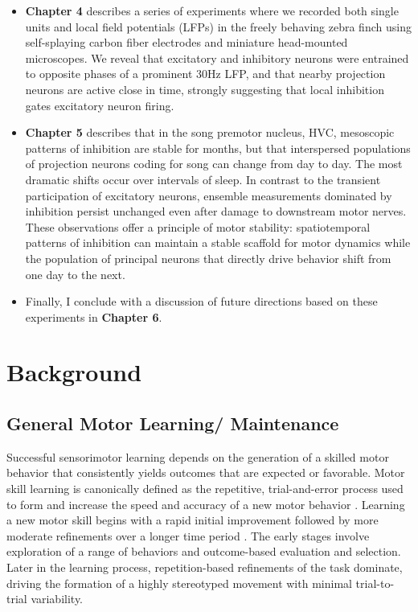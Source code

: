 \begin{itemize}
	\item \textbf{Chapter 4}  describes a series of experiments where we recorded both single units and local field potentials (LFPs) in the freely behaving zebra finch using self-splaying carbon fiber electrodes and miniature head-mounted microscopes. We reveal that excitatory and inhibitory neurons were entrained to opposite phases of a prominent 30Hz LFP, and that nearby projection neurons are active close in time,  strongly suggesting that local inhibition gates excitatory neuron firing.

	\item  \textbf{Chapter 5} describes that in the song  premotor nucleus, HVC, mesoscopic patterns of inhibition are stable for months, but that interspersed populations of projection neurons coding for song can change from day to day. The most dramatic shifts occur over intervals of sleep. In contrast to the transient participation of excitatory neurons, ensemble measurements dominated by inhibition persist unchanged even after damage to downstream motor nerves. These observations offer a principle of motor stability: spatiotemporal patterns of inhibition can maintain a stable scaffold for motor dynamics while the population of principal neurons that directly drive behavior shift from one day to the next.

	\item Finally, I conclude with a discussion of future directions based on these experiments in \textbf{Chapter 6}.
		
	\end{itemize}


\section{Background}


\subsection{ General Motor Learning/ Maintenance}

Successful sensorimotor learning depends on the generation of a skilled motor behavior that consistently yields outcomes that are expected or favorable. Motor skill learning is canonically defined as the repetitive, trial-and-error process used to form and increase the speed and accuracy of a new motor behavior \cite{Diedrichsen2015-zc}  \cite{Shmuelof2014-xs} \cite{Shmuelof2014-tn}. Learning a new motor skill begins with a rapid initial improvement followed by more moderate refinements over a longer time period \cite{Karni1998-mu}. The early stages involve exploration of a range of behaviors and outcome-based evaluation and selection.  Later in the learning process, repetition-based refinements of the task dominate, driving the formation of a highly stereotyped movement with minimal trial-to-trial variability. 

